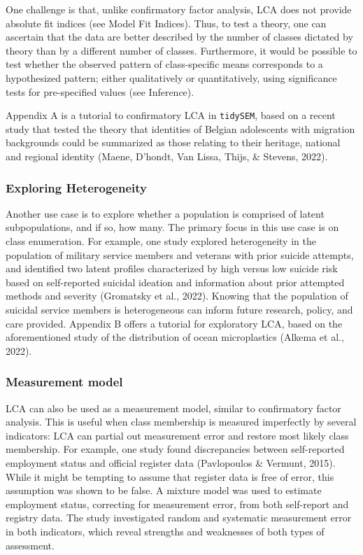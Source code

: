 \documentclass[
  ,man,floatsintext]{apa6}
\begin{document}
One challenge is that, unlike confirmatory factor analysis, LCA does not
provide absolute fit indices (see Model Fit Indices). Thus, to test a
theory, one can ascertain that the data are better described by the
number of classes dictated by theory than by a different number of
classes. Furthermore, it would be possible to test whether the observed
pattern of class-specific means corresponds to a hypothesized pattern;
either qualitatively or quantitatively, using significance tests for
pre-specified values (see Inference).

Appendix A is a tutorial to confirmatory LCA in \texttt{tidySEM}, based on a
recent study that tested the theory that identities of Belgian
adolescents with migration backgrounds could be summarized as those
relating to their heritage, national and regional identity
(Maene, D'hondt, Van Lissa, Thijs, \& Stevens, 2022).

\hypertarget{exploring-heterogeneity}{%
\subsubsection{Exploring Heterogeneity}\label{exploring-heterogeneity}}

Another use case is to explore whether a population is comprised of
latent subpopulations, and if so, how many. The primary focus in this
use case is on class enumeration. For example,
one study explored heterogeneity in the population of
military service members and veterans with prior suicide attempts, and
identified two latent profiles characterized by high versus low suicide
risk based on self-reported suicidal ideation and information about
prior attempted methods and severity (Gromatsky et al., 2022).
Knowing that the population of suicidal service members is heterogeneous
can inform future research, policy, and care provided. Appendix B offers
a tutorial for exploratory LCA, based on the aforementioned study of the
distribution of ocean microplastics (Alkema et al., 2022).

\hypertarget{measurement-model}{%
\subsubsection{Measurement model}\label{measurement-model}}

LCA can also be used as a measurement model, similar to confirmatory
factor analysis. This is useful when class membership is measured
imperfectly by several indicators: LCA can partial out measurement error
and restore most likely class membership. For example, one study found
discrepancies between self-reported employment status and official
register data (Pavlopoulos \& Vermunt, 2015). While it might be tempting
to assume that register data is free of error, this assumption was shown
to be false. A mixture model was used to estimate employment status,
correcting for measurement error, from both self-report and registry
data. The study investigated random and systematic measurement error in
both indicators, which reveal strengths and weaknesses of both types of
assessment.
\end{document}
